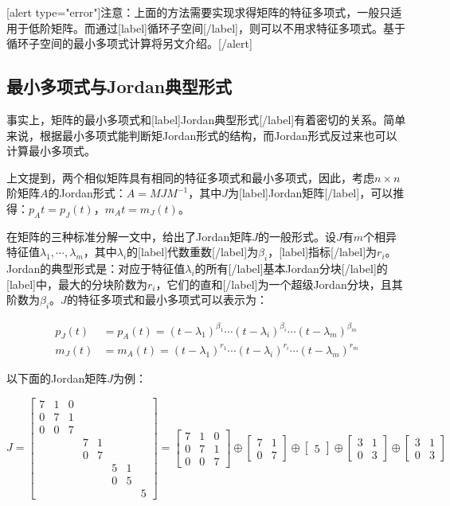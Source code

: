 \documentclass[UTF8,nofonts]{ctexart}
\begin{document}
[alert type="error"]注意：上面的方法需要实现求得矩阵的特征多项式，一般只适用于低阶矩阵。而通过[label]循环子空间[/label]，则可以不用求特征多项式。基于循环子空间的最小多项式计算将另文介绍。[/alert]

\subsection*{最小多项式与Jordan典型形式}

事实上，矩阵的最小多项式和[label]Jordan典型形式[/label]有着密切的关系。简单来说，根据最小多项式能判断矩Jordan形式的结构，而Jordan形式反过来也可以计算最小多项式。

上文提到，两个相似矩阵具有相同的特征多项式和最小多项式，因此，考虑$n \times n$阶矩阵$A$的Jordan形式：$A=MJM^{-1}$，其中$J$为[label]Jordan矩阵[/label]，可以推得：$p_A{t}=p_J(t)$，$m_A{t}=m_J(t)$。

在矩阵的三种标准分解一文中，给出了Jordan矩阵$J$的一般形式。设$J$有$m$个相异特征值$\lambda_1,\cdots,\lambda_m$，其中$\lambda_i$的[label]代数重数[/label]为$\beta_i$，[label]指标[/label]为$r_i$。Jordan的典型形式是：对应于特征值$\lambda_i$的所有[/label]基本Jordan分块[/label]的[label]中，最大的分块阶数为$r_i$，它们的直和[/label]为一个超级Jordan分块，且其阶数为$\beta_i$。$J$的特征多项式和最小多项式可以表示为：

\begin{align*}
p_J(t)&=p_A(t)=(t-\lambda_1)^{\beta_1}\cdots(t-\lambda_i)^{\beta_i}\cdots(t-\lambda_m)^{\beta_m} \\
m_J(t)&=m_A(t)=(t-\lambda_1)^{r_1}\cdots(t-\lambda_i)^{r_i}\cdots(t-\lambda_m)^{r_m}
\end{align*}

以下面的Jordan矩阵$J$为例：

\[J=
\begin{bmatrix}7&1&0&&&&&\\0&7&1&&&&&\\0&0&7&&&&&\\&&&7&1&&&\\&&&0&7&&&\\&&&&&5&1&\\&&&&&0&5&\\&&&&&&&5\end{bmatrix}=
\begin{bmatrix}7&1&0\\0&7&1\\0&0&7\end{bmatrix}\oplus
\begin{bmatrix}7&1\\0&7\end{bmatrix}\oplus
\begin{bmatrix}5\end{bmatrix}\oplus
\begin{bmatrix}3&1\\0&3\end{bmatrix}\oplus
\begin{bmatrix}3&1\\0&3\end{bmatrix}
\]
\end{document}
